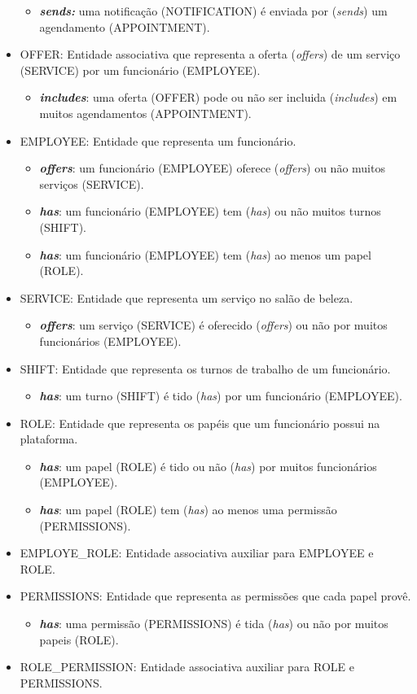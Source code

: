 \begin{itemize}
	\begin{itemize}
		\item \textbf{\textit{sends:}} uma notificação (NOTIFICATION) é enviada por (\textit{sends}) um agendamento (APPOINTMENT).
	\end{itemize}
	\item OFFER: Entidade associativa que representa a oferta (\textit{offers}) de um serviço (SERVICE) por um funcionário (EMPLOYEE).
	\begin{itemize}
		\item \textbf{\textit{includes}}: uma oferta (OFFER) pode ou não ser incluida (\textit{includes}) em muitos agendamentos (APPOINTMENT). 
	\end{itemize}
	\item EMPLOYEE: Entidade que representa um funcionário.
	\begin{itemize}
		\item \textbf{\textit{offers}}: um funcionário (EMPLOYEE) oferece (\textit{offers}) ou não muitos serviços (SERVICE).
		\item \textbf{\textit{has}}: um funcionário (EMPLOYEE) tem (\textit{has}) ou não muitos turnos (SHIFT).
		\item \textbf{\textit{has}}: um funcionário (EMPLOYEE) tem (\textit{has}) ao menos um papel (ROLE).
	\end{itemize}
	\item SERVICE: Entidade que representa um serviço no salão de beleza.
	\begin{itemize}
		\item \textbf{\textit{offers}}: um serviço (SERVICE) é oferecido (\textit{offers}) ou não por muitos funcionários (EMPLOYEE).
	\end{itemize}
	\item SHIFT: Entidade que representa os turnos de trabalho de um funcionário.
	\begin{itemize}
		\item \textbf{\textit{has}}: um turno (SHIFT) é tido (\textit{has}) por um funcionário (EMPLOYEE).
	\end{itemize}
	\item ROLE: Entidade que representa os papéis que um funcionário possui na plataforma.
	\begin{itemize}
		\item \textbf{\textit{has}}: um papel (ROLE) é tido ou não (\textit{has}) por muitos funcionários (EMPLOYEE).
		\item \textbf{\textit{has}}: um papel (ROLE) tem (\textit{has}) ao menos uma permissão (PERMISSIONS).
	\end{itemize}
	\item EMPLOYE\_ROLE: Entidade associativa auxiliar para EMPLOYEE e ROLE.
	\item PERMISSIONS: Entidade que representa as permissões que cada papel provê.
	\begin{itemize}
		\item \textbf{\textit{has}}: uma permissão (PERMISSIONS) é tida (\textit{has}) ou não por muitos papeis (ROLE).
\end{itemize}
	\item ROLE\_PERMISSION: Entidade associativa auxiliar para ROLE e PERMISSIONS.
\end{itemize}
